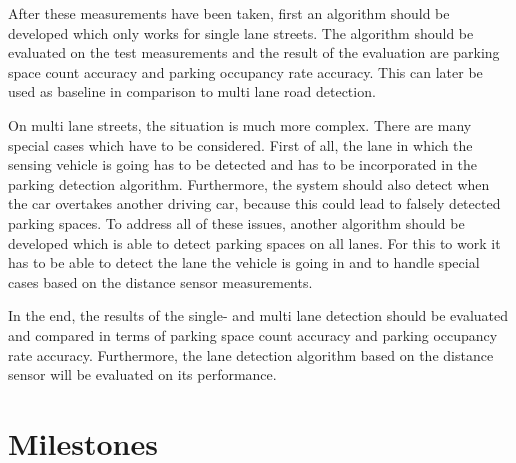 \documentclass[11pt,a4paper,titlepage,
chapterprefix,headsepline,parskip,pdftex,
,pointlessnumbers,bibtotoc]{article}
\begin{document}
After these measurements have been taken, first an algorithm should be developed which only works for single lane streets. The algorithm should be evaluated on the test measurements and the result of the evaluation are parking space count accuracy and parking occupancy rate accuracy. This can later be used as baseline in comparison to multi lane road detection. 

On multi lane streets, the situation is much more complex. There are many special cases which have to be considered. First of all, the lane in which the sensing vehicle is going has to be detected and has to be incorporated in the parking detection algorithm. Furthermore, the system should also detect when the car overtakes another driving car, because this could lead to falsely detected parking spaces. To address all of these issues, another algorithm should be developed which is able to detect parking spaces on all lanes. For this to work it has to be able to detect the lane the vehicle is going in and to handle special cases based on the distance sensor measurements.

In the end, the results of the single- and multi lane detection should be evaluated and compared in terms of parking space count accuracy and parking occupancy rate accuracy. Furthermore, the lane detection algorithm based on the distance sensor will be evaluated on its performance.




\newpage

\section{Milestones}

\end{document}
